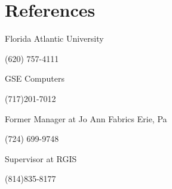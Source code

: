\documentclass[letterpaper]{resume}
\begin{document}



\newpage
\section{References}


\begin{compactitem}
\item Florida Atlantic University
\item (620) 757-4111
\end{compactitem}


\begin{compactitem}
\item GSE Computers
\item (717)201-7012
\end{compactitem}

\begin{compactitem}
\item Former Manager at Jo Ann Fabrics Erie, Pa
\item (724) 699-9748
\end{compactitem}

\begin{compactitem}
\item Supervisor at RGIS
\item (814)835-8177
\end{compactitem}

\end{document}
